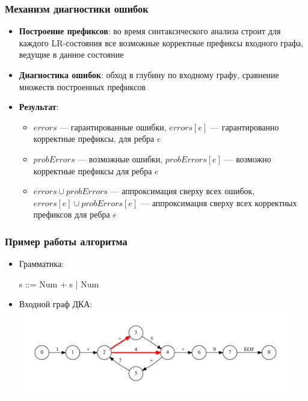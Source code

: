 \documentclass{beamer}
\begin{document}
\begin{frame}[fragile]
	\transwipe[direction=90]
	\frametitle{Механизм диагностики ошибок}
    \begin{itemize}
        \item \textbf{Построение префиксов}: во время синтаксического анализа строит для каждого LR-состояния все возможные корректные префиксы входного графа, ведущие в данное состояние
        \item \textbf{Диагностика ошибок}: обход в глубину по входному графу, сравнение множеств построенных префиксов
        \item \textbf{Результат}:
            \begin{itemize}
                \item $errors$ --- гарантированные ошибки, $errors[e]$ --- гарантированно корректные префиксы, для ребра $e$
                \item $probErrors$ --- возможные ошибки, $probErrors[e]$ --- возможно корректные префиксы для ребра $e$
                \item $errors \cup probErrors$ --- аппроксимация сверху всех ошибок, $errors[e] \cup probErrors[e]$ --- аппроксимация сверху всех корректных префиксов для ребра $e$
            \end{itemize}
    \end{itemize}
    
\end{frame}

\begin{frame}[fragile]
	\transwipe[direction=90]
	\frametitle{Пример работы алгоритма}
	\begin{itemize}
	    \item Грамматика:
	 
     s ::= Num + s | Num 
    
    \item
    Входной граф ДКА:
	            \includegraphics[width=340pt]{pictures/ErrorEdges.pdf}
    \end{itemize}
    
\end{frame}
\end{document}
